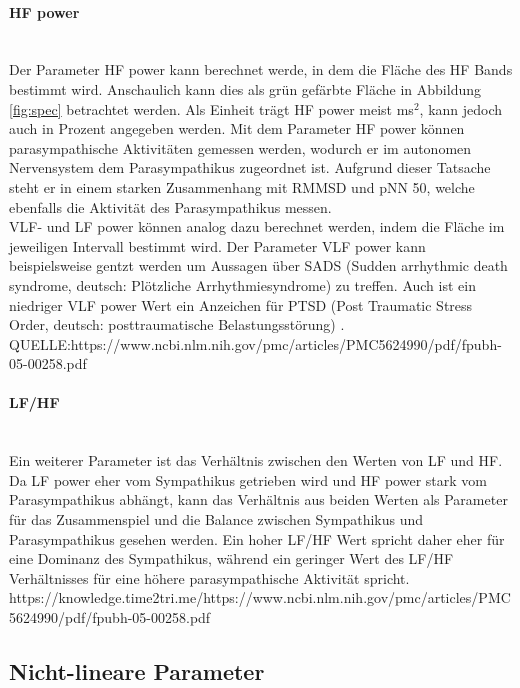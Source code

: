  \paragraph{HF power}\mbox{} \\
 Der Parameter HF power kann berechnet werde, in dem die Fläche des HF Bands bestimmt wird. Anschaulich kann dies als grün gefärbte Fläche in Abbildung \ref{fig:spec} betrachtet werden. Als Einheit trägt HF power meist ms$^{2}$, kann jedoch auch in Prozent angegeben werden. 
 Mit dem Parameter HF power können parasympathische Aktivitäten gemessen werden, wodurch er im autonomen Nervensystem dem Parasympathikus zugeordnet ist. Aufgrund dieser Tatsache steht er in einem starken Zusammenhang mit RMMSD und pNN 50, welche ebenfalls die Aktivität des Parasympathikus messen. \\
 VLF- und LF power können analog dazu berechnet werden, indem die Fläche im jeweiligen Intervall bestimmt wird. Der Parameter VLF power kann beispielsweise gentzt werden um Aussagen über SADS (Sudden arrhythmic death syndrome, deutsch: Plötzliche Arrhythmiesyndrome) zu treffen. Auch ist ein niedriger VLF power Wert ein Anzeichen für PTSD (Post Traumatic Stress Order, deutsch: posttraumatische Belastungsstörung) . QUELLE:https://www.ncbi.nlm.nih.gov/pmc/articles/PMC5624990/pdf/fpubh-05-00258.pdf
 
 \paragraph{LF/HF}\mbox{} \\
 Ein weiterer Parameter ist das Verhältnis zwischen den Werten von LF und HF. Da LF power eher vom Sympathikus getrieben wird und HF power stark vom Parasympathikus abhängt, kann das Verhältnis aus beiden Werten als Parameter für das Zusammenspiel und die Balance zwischen Sympathikus und Parasympathikus gesehen werden. Ein hoher LF/HF Wert spricht daher eher für eine Dominanz des Sympathikus, während ein geringer Wert des LF/HF Verhältnisses für eine höhere parasympathische Aktivität spricht. https://knowledge.time2tri.me/https://www.ncbi.nlm.nih.gov/pmc/articles/PMC5624990/pdf/fpubh-05-00258.pdf
 
 \subsection{Nicht-lineare Parameter}
 
